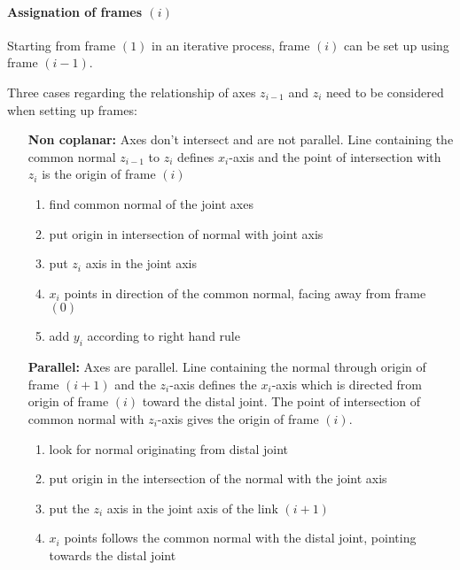 \paragraph{Assignation of frames $(i)$}

Starting from frame $(1)$ in an iterative process, frame $(i)$ can be set up using frame $(i-1)$.

Three cases regarding the relationship of axes $z_{i-1}$ and $z_i$  need to be considered when setting up frames:
\begin{itemize}[wide=\parindent] %
	\item[\textbf{Non coplanar:}] Axes don't intersect and are not parallel. Line containing the common normal $z_{i-1}$ to $z_i$ defines $x_i$-axis and the point of intersection with $z_i$ is the origin of frame $(i)$
	\begin{enumerate}[label=\emph{\alph*)}]
		\item find common normal of the joint axes
		\item put origin in intersection of normal with joint axis
		\item put $z_i$ axis in the joint axis
		\item $x_i$ points in direction of the common normal, facing away from frame $(0)$
		\item add $y_i$ according to right hand rule
	\end{enumerate}
	\item[\textbf{Parallel:}] Axes are parallel. Line containing the normal through origin of frame $(i+1)$ and the $z_i$-axis defines the $x_i$-axis which is directed from origin of frame $(i)$ toward the distal joint. The point of intersection of common normal with $z_i$-axis gives the origin of frame $(i)$. %
		\begin{enumerate}[label=\emph{\alph*)}]
		\item look for normal originating from distal joint
		\item put origin in the intersection of the normal with the joint axis
		\item put the $z_i$ axis in the joint axis of the link $(i+1)$ 
		\item $x_i$ points follows the common normal with the distal joint, pointing towards the distal joint

\end{enumerate}
\end{itemize}
